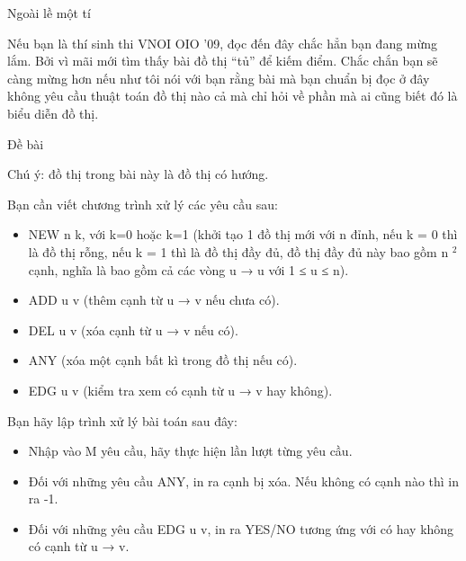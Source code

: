 Ngoài lề một tí     

   Nếu bạn là thí sinh thi VNOI OIO '09, đọc đến đây chắc hẳn bạn đang mừng lắm. Bởi vì mãi mới tìm thấy bài đồ thị “tủ” để kiếm điểm. Chắc chắn bạn sẽ càng mừng hơn nếu như tôi nói với bạn rằng bài mà bạn chuẩn bị đọc ở đây không yêu cầu thuật toán đồ thị nào cả mà chỉ hỏi về phần mà ai cũng biết đó là biểu diễn đồ thị.  

       Đề bài     

   Chú ý: đồ thị trong bài này là đồ thị có hướng.  

   Bạn cần viết chương trình xử lý các yêu cầu sau:  
\begin{itemize}
	\item     NEW n k, với k=0 hoặc k=1 (khởi tạo 1 đồ thị mới với n đỉnh, nếu k = 0 thì là đồ thị rỗng, nếu k = 1 thì là đồ thị đầy đủ, đồ thị đầy đủ này bao gồm n    $^     2    $    cạnh, nghĩa là bao gồm cả các vòng u → u với 1 ≤ u ≤ n).   
	\item     ADD u v (thêm cạnh từ u → v nếu chưa có).   
	\item     DEL u v (xóa cạnh từ u → v nếu có).   
	\item     ANY (xóa một cạnh bất kì trong đồ thị nếu có).   
	\item     EDG u v (kiểm tra xem có cạnh từ u → v hay không).   
\end{itemize}

   Bạn hãy lập trình xử lý bài toán sau đây:  
\begin{itemize}
	\item     Nhập vào M yêu cầu, hãy thực hiện lần lượt từng yêu cầu.   
	\item     Đối với những yêu cầu ANY, in ra cạnh bị xóa. Nếu không có cạnh nào thì in ra -1.   
	\item     Đối với những yêu cầu EDG u v, in ra YES/NO tương ứng với có hay không có cạnh từ u → v.   
\end{itemize}